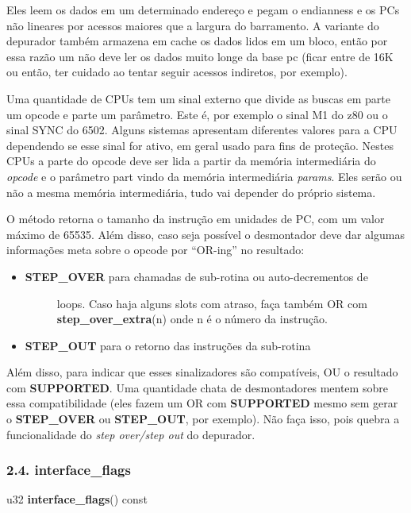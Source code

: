 \documentclass[letterpaper,10pt,brazil]{sphinxmanual}
\begin{document}
Eles leem os dados em um determinado endereço e pegam o endianness e os
PCs não lineares por acessos maiores que a largura do barramento.
A variante do depurador também armazena em cache os dados lidos em um
bloco, então por essa razão um não deve ler os dados muito longe da base
pc (ficar entre de 16K ou então, ter cuidado ao tentar seguir acessos
indiretos, por exemplo).

Uma quantidade de CPUs tem um sinal externo que divide as buscas em
parte um opcode e parte um parâmetro. Este é, por exemplo o sinal M1
do z80 ou o sinal SYNC do 6502. Alguns sistemas apresentam
diferentes valores para a CPU dependendo se esse sinal for
ativo, em geral usado para fins de proteção. Nestes CPUs a parte do opcode
deve ser lida a partir da memória intermediária do \emph{opcode} e o
parâmetro part vindo da memória intermediária \emph{params}. Eles serão ou
não a mesma memória intermediária, tudo vai depender do próprio sistema.

O método retorna o tamanho da instrução em unidades de PC, com um valor
máximo de 65535. Além disso, caso seja possível o desmontador deve
dar algumas informações meta sobre o opcode por ``OR-ing'' no resultado:
\begin{itemize}
\item {} \begin{description}
\item[{\textbf{STEP\_OVER} para chamadas de sub-rotina ou auto-decrementos de}] \leavevmode
loops. Caso haja alguns slots com atraso, faça também OR com
\textbf{step\_over\_extra}(n) onde n é o número da instrução.

\end{description}

\item {} 
\textbf{STEP\_OUT} para o retorno das instruções da sub-rotina

\end{itemize}

Além disso, para indicar que esses sinalizadores são compatíveis, OU o
resultado com \textbf{SUPPORTED}. Uma quantidade chata de desmontadores mentem
sobre essa compatibilidade (eles fazem um OR com \textbf{SUPPORTED} mesmo sem
gerar o \textbf{STEP\_OVER} ou \textbf{STEP\_OUT}, por exemplo). Não faça
isso, pois quebra a funcionalidade do \emph{step over/step out} do depurador.


\subsubsection{2.4. interface\_flags}
\label{techspecs/device_disasm_interface:interface-flags}
\begin{DUlineblock}{0em}
\item[] u32 \textbf{interface\_flags}() const
\end{DUlineblock}
\end{document}
